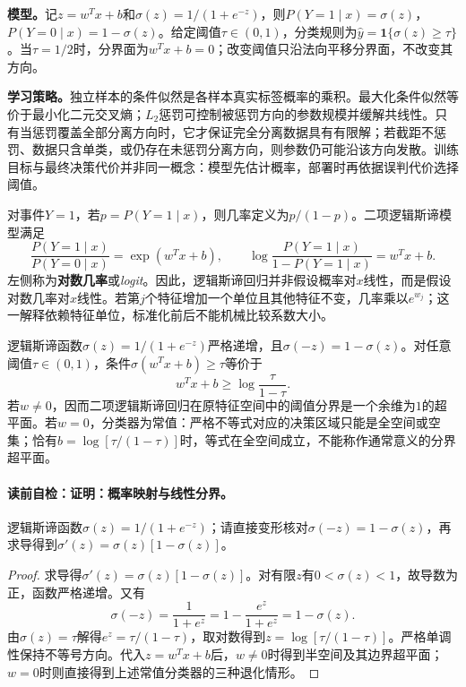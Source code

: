 \label{struct:V2-C05-CH08}
\textbf{模型。}记$z=w^Tx+b$和$\sigma(z)=1/(1+e^{-z})$，则$P(Y=1\mid x)=\sigma(z)$，$P(Y=0\mid x)=1-\sigma(z)$。给定阈值$\tau\in(0,1)$，分类规则为$\widehat y=\mathbf 1\{\sigma(z)\geq\tau\}$。当$\tau=1/2$时，分界面为$w^Tx+b=0$；改变阈值只沿法向平移分界面，不改变其方向。

\label{struct:V2-C05-CH09}
\textbf{学习策略。}独立样本的条件似然是各样本真实标签概率的乘积。最大化条件似然等价于最小化二元交叉熵；$L_2$惩罚可控制被惩罚方向的参数规模并缓解共线性。只有当惩罚覆盖全部分离方向时，它才保证完全分离数据具有有限解；若截距不惩罚、数据只含单类，或仍存在未惩罚分离方向，则参数仍可能沿该方向发散。训练目标与最终决策代价并非同一概念：模型先估计概率，部署时再依据误判代价选择阈值。


对事件$Y=1$，若$p=P(Y=1\mid x)$，则几率定义为$p/(1-p)$。二项逻辑斯谛模型满足
\[
\frac{P(Y=1\mid x)}{P(Y=0\mid x)}=\exp(w^Tx+b),
\qquad
\log\frac{P(Y=1\mid x)}{1-P(Y=1\mid x)}=w^Tx+b.
\]
左侧称为\textbf{对数几率}或\emph{logit}。因此，逻辑斯谛回归并非假设概率对$x$线性，而是假设对数几率对$x$线性。若第$j$个特征增加一个单位且其他特征不变，几率乘以$e^{w_j}$；这一解释依赖特征单位，标准化前后不能机械比较系数大小。

\label{struct:V2-C05-CH12}
\begin{theorem}[概率映射与线性分界]\label{thm:V2-C05-sigmoid}
逻辑斯谛函数$\sigma(z)=1/(1+e^{-z})$严格递增，且$\sigma(-z)=1-\sigma(z)$。对任意阈值$\tau\in(0,1)$，条件$\sigma(w^Tx+b)\geq\tau$等价于
\[
w^Tx+b\geq\log\frac{\tau}{1-\tau}.
\]
若$w\ne0$，因而二项逻辑斯谛回归在原特征空间中的阈值分界是一个余维为$1$的超平面。若$w=0$，分类器为常值：严格不等式对应的决策区域只能是全空间或空集；恰有$b=\log[\tau/(1-\tau)]$时，等式在全空间成立，不能称作通常意义的分界超平面。
\end{theorem}

\label{struct:V2-C05-CH13}
\paragraph{读前自检：证明：概率映射与线性分界。}逻辑斯谛函数$\sigma(z)=1/(1+e^{-z})$；请直接变形核对$\sigma(-z)=1-\sigma(z)$，再求导得到$\sigma'(z)=\sigma(z)[1-\sigma(z)]$。\par

\begin{proof}
求导得$\sigma'(z)=\sigma(z)[1-\sigma(z)]$。对有限$z$有$0<\sigma(z)<1$，故导数为正，函数严格递增。又有
\[
\sigma(-z)=\frac{1}{1+e^z}=1-\frac{e^z}{1+e^z}=1-\sigma(z).
\]
由$\sigma(z)=\tau$解得$e^z=\tau/(1-\tau)$，取对数得到$z=\log[\tau/(1-\tau)]$。严格单调性保持不等号方向。代入$z=w^Tx+b$后，$w\ne0$时得到半空间及其边界超平面；$w=0$时则直接得到上述常值分类器的三种退化情形。
\end{proof}

